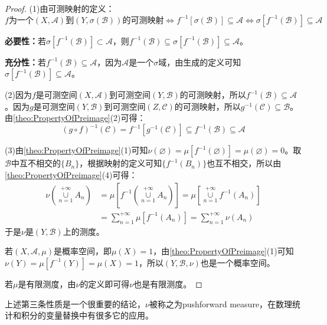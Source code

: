 \begin{proof}
	(1)由可测映射的定义：
	\begin{equation*}
		\text{$f$为一个$(X,\mathscr{A})$到$(Y,\sigma(\mathscr{B}))$的可测映射}
		\Leftrightarrow f^{-1}[\sigma(\mathscr{B})]\subseteq\mathscr{A}
		\Leftrightarrow
		\sigma[f^{-1}(\mathscr{B})]\subseteq\mathscr{A}
	\end{equation*}\par
	\textbf{必要性：}若$\sigma[f^{-1}(\mathscr{B})]\subset\mathscr{A}$，则$f^{-1}(\mathscr{B})\subseteq\sigma[f^{-1}(\mathscr{B})]\subseteq\mathscr{A}$。\par
	\textbf{充分性：}若$f^{-1}(\mathscr{B})\subseteq\mathscr{A}$，因为$\mathscr{A}$是一个$\sigma$域，由生成的定义可知$\sigma[f^{-1}(\mathscr{B})]\subseteq\mathscr{A}$。\par
	(2)因为$f$是可测空间$(X,\mathscr{A})$到可测空间$(Y,\mathscr{B})$的可测映射，所以$f^{-1}(\mathscr{B})\subseteq\mathscr{A}$。因为$g$是可测空间$(Y,\mathscr{B})$到可测空间$(Z,\mathscr{C})$的可测映射，所以$g^{-1}(\mathscr{C})\subseteq\mathscr{B}$。由\cref{theo:PropertyOfPreimage}(2)可得：
	\begin{equation*}
		(g\circ f)^{-1}(\mathscr{C})=f^{-1}[g^{-1}(\mathscr{C})]\subseteq f^{-1}(\mathscr{B})\subseteq\mathscr{A}
	\end{equation*}\par
	(3)由\cref{theo:PropertyOfPreimage}(1)可知$\nu(\varnothing)=\mu[f^{-1}(\varnothing)]=\mu(\varnothing)=0$。取$\mathscr{B}$中互不相交的$\{B_n\}$，根据映射的定义可知$\{f^{-1}(B_n)\}$也互不相交，所以由\cref{theo:PropertyOfPreimage}(4)可得：
	\begin{align*}
		\nu\left(\underset{n=1}{\overset{+\infty}{\cup}}A_n\right)&=\mu\left[f^{-1}\left(\underset{n=1}{\overset{+\infty}{\cup}}A_n\right)\right]=\mu\left[\underset{n=1}{\overset{+\infty}{\cup}}f^{-1}(A_n)\right] \\
		&=\sum_{n=1}^{+\infty}\mu[f^{-1}(A_n)]=\sum_{n=1}^{+\infty}\nu(A_n)
	\end{align*}
	于是$\nu$是$(Y,\mathscr{B})$上的测度。\par
	若$(X,\mathscr{A},\mu)$是概率空间，即$\mu(X)=1$，由\cref{theo:PropertyOfPreimage}(1)可知$\nu(Y)=\mu[f^{-1}(Y)]=\mu(X)=1$，所以$(Y,\mathscr{B},\nu)$也是一个概率空间。\par
	若$\mu$是有限测度，由$\nu$的定义即可得$\nu$也是有限测度。\par
\end{proof}
\begin{note}
	上述第三条性质是一个很重要的结论，$\nu$被称之为pushforward measure，在数理统计和积分的变量替换中有很多它的应用。
\end{note}

